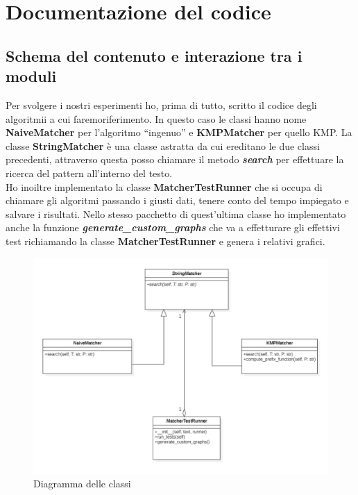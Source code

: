 \documentclass{article}
\begin{document}
\newpage
\section{Documentazione del codice}
\subsection{Schema del contenuto e interazione tra i moduli}
Per svolgere i nostri esperimenti ho, prima di tutto, scritto il codice degli algoritmii a cui faremoriferimento. In questo caso le classi hanno nome \textbf{NaiveMatcher} per l'algoritmo ``ingenuo'' e \textbf{KMPMatcher} per quello KMP. La classe \textbf{StringMatcher} è una classe astratta da cui ereditano le due classi precedenti, attraverso questa posso chiamare il metodo \textbf{\textit{search}} per effettuare la ricerca del pattern all'interno del testo.\\
Ho inoiltre implementato la classe \textbf{MatcherTestRunner} che si occupa di chiamare gli algoritmi passando i giusti dati, tenere conto del tempo impiegato e salvare i risultati. Nello stesso pacchetto di quest'ultima classe ho implementato anche la funzione \textbf{\textit{generate\_custom\_graphs}} che va a effetturare gli effettivi test richiamando la classe \textbf{MatcherTestRunner} e genera i relativi grafici.
\begin{figure}[H]
    \centering
    \includegraphics[width=1\textwidth]{img/UML.png}
    \caption{Diagramma delle classi}
    \label{fig:uml-diagram}
\end{figure}
\end{document}
